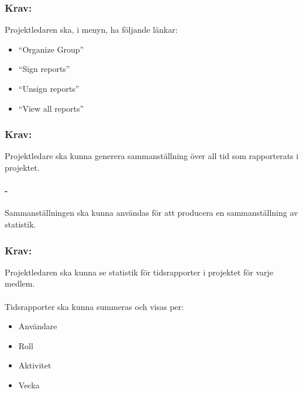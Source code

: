 \documentclass[paper=a4, fontsize=11pt,twoside]{article}
\begin{document}
\paragraph{}

\subsubsection{Krav:}
 Projektledaren ska, i menyn, ha följande länkar:
 \begin{itemize}
 \item “Organize Group”
 \item “Sign reports”
 \item “Unsign reports”
 \item “View all reports”
 \end{itemize}

\paragraph{}

\subsubsection{Krav:}
Projektledare ska kunna generera sammanställning över all tid som rapporterats i projektet.
\paragraph{-}
Sammanställningen ska kunna användas för att producera en sammanställning av statistik.

\paragraph{}

\subsubsection{Krav:}
Projektledaren ska kunna se statistik för tidsrapporter i projektet för varje medlem.
\paragraph{}
Tidsrapporter ska kunna summeras och visas per:
\begin{itemize}
\item Användare
\item Roll
\item Aktivitet
\item Vecka
\end{itemize}
\end{document}
